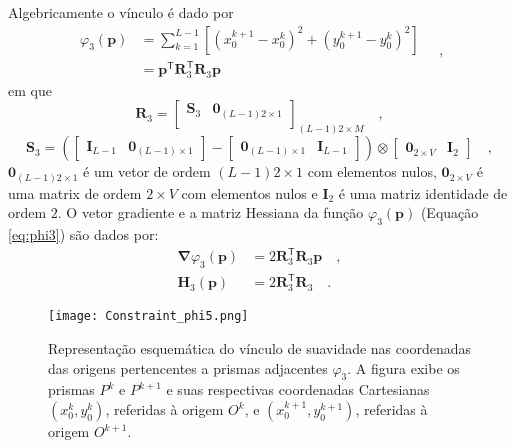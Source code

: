Algebricamente o vínculo é dado por
\begin{equation}\label{eq:phi3}
\begin{split}
\varphi_{3}(\mathbf{p}) &= \sum\limits^{L-1}_{k=1}\left[\left(x_{0}^{k+1} - x_{0}^{k}\right)^2 + \left(y_{0}^{k+1} - y_{0}^{k}\right)^2 \right] \\
&= \mathbf{p}^{\mathsf{T}} \mathbf{R}^{\mathsf{T}}_{3}\mathbf{R}_{3}\mathbf{p}
\end{split} \quad ,
\end{equation}
em que 
\begin{equation}
\mathbf{R}_{3} = 
\begin{bmatrix}
\mathbf{S}_{3} & \mathbf{0}_{(L-1)2 \times 1} \\
\end{bmatrix}_{(L-1)2 \times M} \quad ,
\label{eq:R3-matrix}
\end{equation}
\begin{equation}
\mathbf{S}_{3} =
\left( 
\begin{bmatrix} \mathbf{I}_{L-1} & \mathbf{0}_{(L-1) \times 1} \end{bmatrix} -
\begin{bmatrix} \mathbf{0}_{(L-1) \times 1} & \mathbf{I}_{L-1} \end{bmatrix} 
\right) \otimes 
\begin{bmatrix} \mathbf{0}_{2 \times V} & \mathbf{I}_{2} \end{bmatrix} \quad ,
\label{eq:S3-matrix}
\end{equation}
$\mathbf{0}_{(L-1)2 \times 1}$ é um vetor de ordem $(L-1)2 \times 1$ com elementos nulos,
$\mathbf{0}_{2 \times V}$ é uma matrix de ordem $2 \times V$ com elementos nulos e 
$\mathbf{I}_{2}$ é uma matriz identidade de ordem $2$. O vetor gradiente e a matriz Hessiana da função $\varphi_{3}(\mathbf{p})$ (Equação \ref{eq:phi3}) são dados por:
\begin{equation}\label{eq:phi3_gh}
\begin{split}
\boldsymbol{\nabla}\varphi_{3}(\mathbf{p}) &= 2\mathbf{R}^\mathsf{T}_{3}\mathbf{R}_{3}\mathbf{p} \quad ,\\
\mathbf{H}_{3}(\mathbf{p}) &= 2\mathbf{R}^\mathsf{T}_{3}\mathbf{R}_{3} \quad .
\end{split}
\end{equation}

\begin{figure}[!htb]
	\centering
	\texttt{[image: Constraint\_phi5.png]}
	\caption{Representação esquemática do vínculo de suavidade nas coordenadas das origens pertencentes a prismas adjacentes $\varphi_{3}$. A figura exibe os prismas $P^k$ e $P^{k+1}$ e suas respectivas coordenadas Cartesianas $(x_0^k,y_0^k)$, referidas à origem $O^k$, e $(x_0^{k+1},y_0^{k+1})$, referidas à origem $O^{k+1}$.}
	\label{fig:phi3}
\end{figure}

